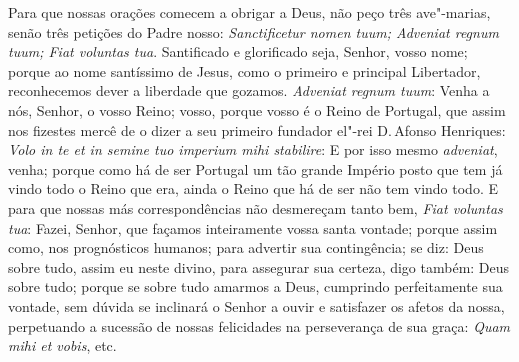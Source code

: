 Para que nossas orações comecem a obrigar a Deus, não peço três ave"-marias, senão três petições do Padre nosso: \emph{Sanctificetur nomen
tuum; Adveniat regnum tuum; Fiat voluntas tua}. Santificado e
glorificado seja, Senhor, vosso nome; porque ao nome santíssimo de
Jesus, como o primeiro e principal Libertador, reconhecemos dever a
liberdade que gozamos. \emph{Adveniat regnum tuum}: Venha a nós,
Senhor, o vosso Reino; vosso, porque vosso é o Reino de Portugal, que
assim nos fizestes mercê de o dizer a seu primeiro fundador el"-rei D.\,Afonso
Henriques: \emph{Volo in te et in semine tuo imperium mihi stabilire}: E
por isso mesmo \emph{adveniat}, venha; porque como há de ser Portugal um
tão grande Império posto que tem já vindo todo o Reino que era, ainda o
Reino que há de ser não tem vindo todo. E para que nossas más
correspondências não desmereçam tanto bem, \emph{Fiat voluntas tua}:
Fazei, Senhor, que façamos inteiramente vossa santa vontade; porque
assim como, nos prognósticos humanos; para advertir sua contingência; se
diz: Deus sobre tudo, assim eu neste divino, para assegurar sua certeza,
digo também: Deus sobre tudo; porque se sobre tudo amarmos a Deus,
cumprindo perfeitamente sua vontade, sem dúvida se inclinará o Senhor a
ouvir e satisfazer os afetos da nossa, perpetuando a sucessão de nossas
felicidades na perseverança de sua graça: \emph{Quam mihi et vobis},
etc.

